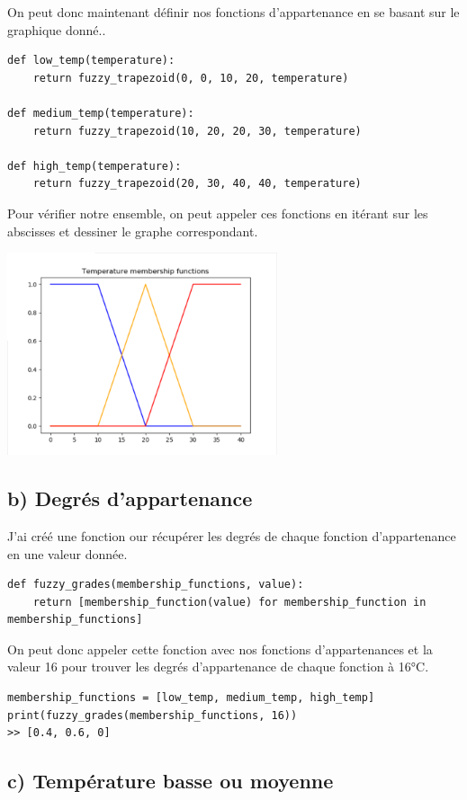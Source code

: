 \documentclass[11pt]{report}
\begin{document}
On peut donc maintenant définir nos fonctions d'appartenance en se basant sur le graphique donné..
\begin{verbatim}
def low_temp(temperature):
    return fuzzy_trapezoid(0, 0, 10, 20, temperature)

def medium_temp(temperature):
    return fuzzy_trapezoid(10, 20, 20, 30, temperature)

def high_temp(temperature):
    return fuzzy_trapezoid(20, 30, 40, 40, temperature)
\end{verbatim}

Pour vérifier notre ensemble, on peut appeler ces fonctions en itérant sur les abscisses et dessiner le graphe correspondant.
\begin{center}
\includegraphics[width=300px]{membership_functions}
\end{center}

\subsection*{b) Degrés d'appartenance}
J'ai créé une fonction our récupérer les degrés de chaque fonction d'appartenance en une valeur donnée.
\begin{verbatim}
def fuzzy_grades(membership_functions, value):
    return [membership_function(value) for membership_function in membership_functions]
\end{verbatim}

On peut donc appeler cette fonction avec nos fonctions d'appartenances et la valeur 16 pour trouver les degrés d'appartenance de chaque fonction à 16°C.
\begin{verbatim}
membership_functions = [low_temp, medium_temp, high_temp]
print(fuzzy_grades(membership_functions, 16))
>> [0.4, 0.6, 0]
\end{verbatim}

\subsection*{c) Température basse ou moyenne}
\end{document}
